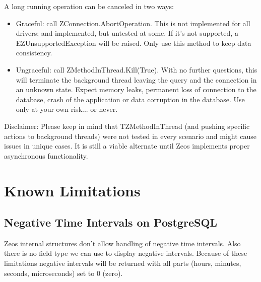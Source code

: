 \documentclass[a4paper,12pt,oneside]{article}
\begin{document}
A long running operation can be canceled in two ways:
\begin{itemize}
  \item 
	  Graceful: call ZConnection.AbortOperation.
    This is not implemented for all drivers; and implemented, but untested at some.
		If it's not supported, a EZUnsupportedException will be raised.
		Only use this method to keep data consistency.
  \item
	  Ungraceful: call ZMethodInThread.Kill(True).
    With no further questions, this will terminate the background thread leaving the query and the connection in an unknown state.
		Expect memory leaks, permanent loss of connection to the database, crash of the application or data corruption in the database.
		Use only at your own risk... or never.
\end{itemize}

Disclaimer:
Please keep in mind that TZMethodInThread (and pushing specific actions to background threads) were not tested in every scenario and might cause issues in unique cases.
It is still a viable alternate until Zeos implements proper asynchronous functionality.

\section{Known Limitations}

\subsection{Negative Time Intervals on PostgreSQL}
Zeos internal structures don't allow handling of negative time intervals.
Also there is no field type we can use to display negative intervals.
Because of these limitations negative intervals will be returned with all parts (hours, minutes, seconds, microseconds) set to 0 (zero).
\end{document}
